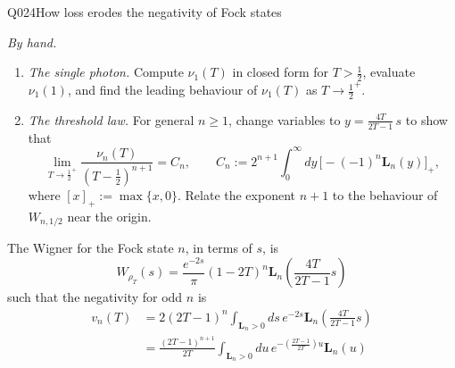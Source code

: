 \begin{entry}{Q024}{How loss erodes the negativity of Fock states}
\begin{problem}
\medskip\noindent\emph{By hand.}
\begin{enumerate}[label=\textbf{(\alph*)},leftmargin=*]
  \item \emph{The single photon.} Compute $\nu_1(T)$ in closed form for $T>\tfrac12$,
        evaluate $\nu_1(1)$, and find the leading behaviour of $\nu_1(T)$ as
        $T\to\tfrac12^{+}$.

  \item \emph{The threshold law.} For general $n\ge1$, change variables to
        $y=\frac{4T}{2T-1}\,s$ to show that
        \begin{equation}
          \lim_{T\to\frac12^{+}}\frac{\nu_n(T)}{(T-\tfrac12)^{n+1}}=C_n,
          \qquad
          C_n:=2^{n+1}\int_0^\infty dy\,\bigl[-(-1)^{n}\mathbf L_n(y)\bigr]_{+},
          \label{q024:threshold-law}
        \end{equation}
        where $[x]_+:=\max\{x,0\}$. Relate the exponent $n+1$ to the behaviour of
        $W_{n,1/2}$ near the origin.
\end{enumerate}



\end{problem}

\begin{solution}[Part (a)]
The Wigner for the Fock state $n$, in terms of $s$, is  
\begin{equation}
    W_{\rho_T} (s)= \frac{e^{-2 s}}{\pi} (1-2T)^n  \mathbf{L}_n\left(\frac{4T}{2T-1} s\right)
\end{equation}
such that the negativity for odd $n$ is
\begin{equation}
\begin{split}
    v_n(T) &= 2(2T-1)^n\int_{\mathbf{L}_n>0} ds\, e^{-2 s}\mathbf{L}_n\left(\frac{4T}{2T-1} s\right)\\
    &=\frac{(2T-1)^{n+1}}{2T} \int_{\mathbf{L}_n>0} du\, e^{- \left(\frac{2T-1}{2T}\right) u} \mathbf{L}_n\left( u \right)\\
    \label{eq: negativitry any fock}
\end{split}
\end{equation}


\end{solution}
\end{entry}
